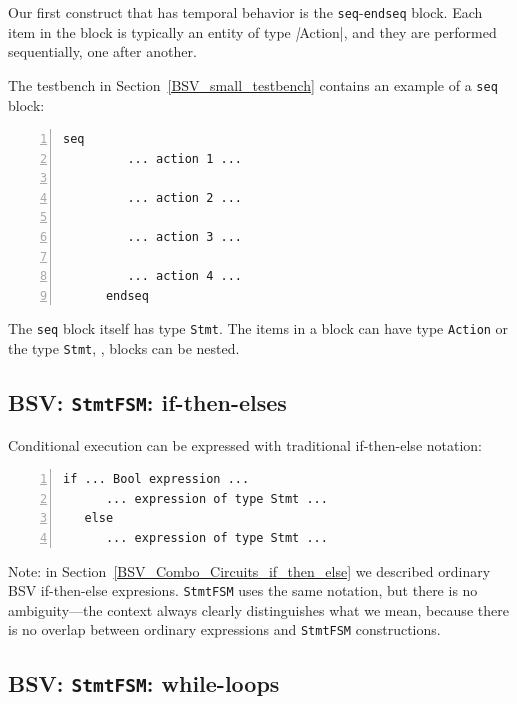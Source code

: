 
Our first construct that has temporal behavior is the
\verb|seq|-\verb|endseq| block.  Each item in the block is typically
an entity of type \emph|Action|, and they are performed sequentially,
one after another.

The testbench in Section~\ref{BSV_small_testbench} contains an example
of a \verb|seq| block:
\begin{Verbatim}[frame=single, numbers=left]
      seq
         ... action 1 ...

         ... action 2 ...

         ... action 3 ...

         ... action 4 ...
      endseq
\end{Verbatim}


The \verb|seq| block itself has type \verb|Stmt|.  The items in a
block can have type \verb|Action| or the type \verb|Stmt|, {\ie},
blocks can be nested.


\subsection{BSV: {\tt StmtFSM}: if-then-elses}


Conditional execution can be expressed with traditional if-then-else notation:
\begin{Verbatim}[frame=single, numbers=left]
   if ... Bool expression ...
      ... expression of type Stmt ...
   else
      ... expression of type Stmt ...
\end{Verbatim}

Note: in Section~\ref{BSV_Combo_Circuits_if_then_else} we described
ordinary BSV if-then-else expresions.  \verb|StmtFSM| uses the same
notation, but there is no ambiguity---the context always clearly
distinguishes what we mean, because there is no overlap between
ordinary expressions and \verb|StmtFSM| constructions.


\subsection{BSV: {\tt StmtFSM}: while-loops}

